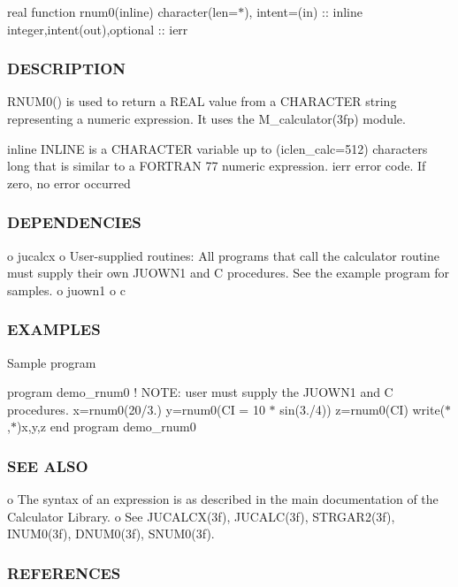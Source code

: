 real function rnum0(inline) character(len=$\ast$), intent=(in) \+:\+: inline integer,intent(out),optional \+:\+: ierr

\subsubsection*{D\+E\+S\+C\+R\+I\+P\+T\+I\+ON}

R\+N\+U\+M0() is used to return a R\+E\+AL value from a C\+H\+A\+R\+A\+C\+T\+ER string representing a numeric expression. It uses the M\+\_\+calculator(3fp) module.

inline I\+N\+L\+I\+NE is a C\+H\+A\+R\+A\+C\+T\+ER variable up to (iclen\+\_\+calc=512) characters long that is similar to a F\+O\+R\+T\+R\+AN 77 numeric expression. ierr error code. If zero, no error occurred

\subsubsection*{D\+E\+P\+E\+N\+D\+E\+N\+C\+I\+ES}

o jucalcx o User-\/supplied routines\+: All programs that call the calculator routine must supply their own J\+U\+O\+W\+N1 and C procedures. See the example program for samples. o juown1 o c \subsubsection*{E\+X\+A\+M\+P\+L\+ES}

Sample program

program demo\+\_\+rnum0 ! N\+O\+TE\+: user must supply the J\+U\+O\+W\+N1 and C procedures. x=rnum0(\textquotesingle{}20/3.\textquotesingle{}) y=rnum0(\textquotesingle{}CI = 10 $\ast$ sin(3./4)\textquotesingle{}) z=rnum0(\textquotesingle{}CI\textquotesingle{}) write($\ast$,$\ast$)x,y,z end program demo\+\_\+rnum0

\subsubsection*{S\+EE A\+L\+SO}

\begin{DoxyVerb}   o The syntax of an expression is as described in the main documentation
     of the Calculator Library.
   o See JUCALCX(3f), JUCALC(3f), STRGAR2(3f), INUM0(3f), DNUM0(3f), SNUM0(3f).
\end{DoxyVerb}


\subsubsection*{R\+E\+F\+E\+R\+E\+N\+C\+ES}

